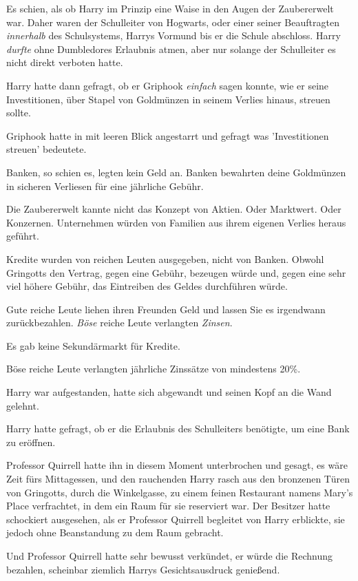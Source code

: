 {Es schien, als ob Harry im Prinzip eine Waise in den Augen der Zaubererwelt war. Daher waren der Schulleiter von Hogwarts, oder einer seiner Beauftragten \emph{innerhalb} des Schulsystems, Harrys Vormund bis er die Schule abschloss. Harry \emph{durfte} ohne Dumbledores Erlaubnis atmen, aber nur solange der Schulleiter es nicht direkt verboten hatte.

Harry hatte dann gefragt, ob er Griphook \emph{einfach} sagen konnte, wie er seine Investitionen, über Stapel von Goldmünzen in seinem Verlies hinaus, streuen sollte.

Griphook hatte in mit leeren Blick angestarrt und gefragt was 'Investitionen streuen' bedeutete.

Banken, so schien es, legten kein Geld an. Banken bewahrten deine Goldmünzen in sicheren Verliesen für eine jährliche Gebühr.

Die Zaubererwelt kannte nicht das Konzept von Aktien. Oder Marktwert. Oder Konzernen. Unternehmen würden von Familien aus ihrem eigenen Verlies heraus geführt.

Kredite wurden von reichen Leuten ausgegeben, nicht von Banken. Obwohl Gringotts den Vertrag, gegen eine Gebühr, bezeugen würde und, gegen eine sehr viel höhere Gebühr, das Eintreiben des Geldes durchführen würde.

Gute reiche Leute liehen ihren Freunden Geld und lassen Sie es irgendwann zurückbezahlen. \emph{Böse} reiche Leute verlangten \emph{Zinsen}.

Es gab keine Sekundärmarkt für Kredite.

Böse reiche Leute verlangten jährliche Zinssätze von mindestens 20\%.

Harry war aufgestanden, hatte sich abgewandt und seinen Kopf an die Wand gelehnt.

Harry hatte gefragt, ob er die Erlaubnis des Schulleiters benötigte, um eine Bank zu eröffnen.

Professor Quirrell hatte ihn in diesem Moment unterbrochen und gesagt, es wäre Zeit fürs Mittagessen, und den rauchenden Harry rasch aus den bronzenen Türen von Gringotts, durch die Winkelgasse, zu einem feinen Restaurant namens Mary's Place verfrachtet, in dem ein Raum für sie reserviert war. Der Besitzer hatte schockiert ausgesehen, als er Professor Quirrell begleitet von Harry erblickte, sie jedoch ohne Beanstandung zu dem Raum gebracht.

Und Professor Quirrell hatte sehr bewusst verkündet, er würde die Rechnung bezahlen, scheinbar ziemlich Harrys Gesichtsausdruck genießend.

}
